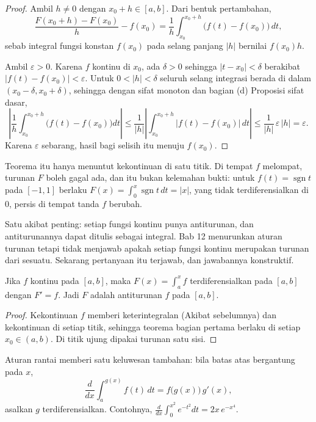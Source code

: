 \begin{proof}
Ambil $h\ne0$ dengan $x_0+h\in[a,b]$. Dari bentuk pertambahan,
\[
\frac{F(x_0+h)-F(x_0)}{h}-f(x_0)
=\frac{1}{h}\int_{x_0}^{x_0+h}\bigl(f(t)-f(x_0)\bigr)\,dt ,
\]
sebab integral fungsi konstan $f(x_0)$ pada selang panjang $|h|$ bernilai
$f(x_0)h$.

Ambil $\varepsilon>0$. Karena $f$ kontinu di $x_0$, ada $\delta>0$ sehingga
$|t-x_0|<\delta$ berakibat $|f(t)-f(x_0)|<\varepsilon$. Untuk $0<|h|<\delta$ seluruh
selang integrasi berada di dalam $(x_0-\delta,x_0+\delta)$, sehingga dengan sifat
monoton dan bagian (d) Proposisi sifat dasar,
\[
\left|\frac{1}{h}\int_{x_0}^{x_0+h}\bigl(f(t)-f(x_0)\bigr)dt\right|
\le\frac{1}{|h|}\left|\int_{x_0}^{x_0+h}\bigl|f(t)-f(x_0)\bigr|\,dt\right|
\le\frac{1}{|h|}\,\varepsilon\,|h|=\varepsilon .
\]
Karena $\varepsilon$ sebarang, hasil bagi selisih itu menuju $f(x_0)$.
\end{proof}

Teorema itu hanya menuntut kekontinuan di satu titik. Di tempat $f$ melompat, turunan
$F$ boleh gagal ada, dan itu bukan kelemahan bukti: untuk $f(t)=\operatorname{sgn} t$
pada $[-1,1]$ berlaku $F(x)=\int_0^x\operatorname{sgn} t\,dt=|x|$, yang tidak
terdiferensialkan di $0$, persis di tempat tanda $f$ berubah.

Satu akibat penting: setiap fungsi kontinu punya antiturunan, dan antiturunannya dapat
ditulis sebagai integral. Bab 12 menurunkan aturan turunan tetapi tidak menjawab apakah
setiap fungsi kontinu merupakan turunan dari sesuatu. Sekarang pertanyaan itu terjawab,
dan jawabannya konstruktif.

\begin{akibat}
Jika $f$ kontinu pada $[a,b]$, maka $F(x)=\int_a^x f$ terdiferensialkan pada $[a,b]$
dengan $F'=f$. Jadi $F$ adalah antiturunan $f$ pada $[a,b]$.
\end{akibat}

\begin{proof}
Kekontinuan $f$ memberi keterintegralan (Akibat sebelumnya) dan kekontinuan di setiap
titik, sehingga teorema bagian pertama berlaku di setiap $x_0\in(a,b)$. Di titik ujung
dipakai turunan satu sisi.
\end{proof}

Aturan rantai memberi satu keluwesan tambahan: bila batas atas bergantung pada $x$,
\[
\frac{d}{dx}\int_a^{g(x)}f(t)\,dt=f\bigl(g(x)\bigr)\,g'(x),
\]
asalkan $g$ terdiferensialkan. Contohnya,
$\frac{d}{dx}\int_0^{x^2}e^{-t^2}dt=2x\,e^{-x^4}$.

